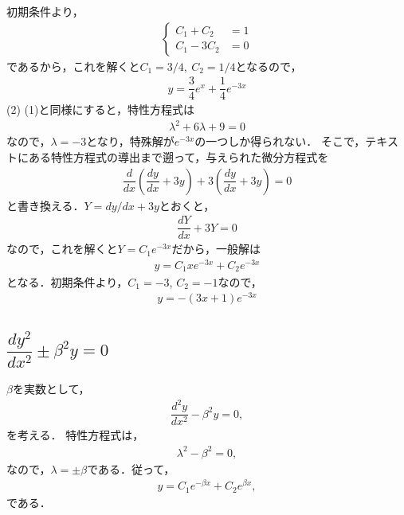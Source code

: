 初期条件より，
\begin{align}
  \begin{cases}
    C_1 + C_2   &= 1 \\
    C_1 - 3C_2  &= 0 
  \end{cases}
\end{align}
であるから，これを解くと$C_1=3/4,~C_2 = 1/4$となるので，
\begin{align}
 y = \dfrac{3}{4}e^{x} + \dfrac{1}{4}e^{-3x} 
\end{align}
%
(2) (1)と同様にすると，特性方程式は
\begin{align}
  \lambda^2 + 6\lambda + 9 = 0 
\end{align}
なので，$\lambda = -3$となり，特殊解が$e^{-3x}$の一つしか得られない．
そこで，テキストにある特性方程式の導出まで遡って，与えられた微分方程式を
\begin{align}
  \dfrac{d}{dx}\left(\dfrac{dy}{dx}+3y\right) + 3\left(\dfrac{dy}{dx}+3y\right) = 0 
\end{align}
と書き換える．$Y=dy/dx+3y$とおくと，
\begin{align}
  \dfrac{dY}{dx} + 3Y = 0 
\end{align}
なので，これを解くと$Y=C_1 e^{-3x}$だから，一般解は
\begin{align}
 y = C_1 x e^{-3x} + C_2 e^{-3x}
\end{align}
となる．初期条件より，$C_1=-3$, $C_2=-1$なので，
\begin{align}
  y = -\left(3x+1\right)e^{-3x} 
\end{align}
%
\newpage
%
%
\subsection{$\dfrac{dy^2}{dx^2} \pm \beta^2 y =0$}
$\beta$を実数として，
\begin{align}
  \dfrac{d^2 y}{dx^2} - \beta^{2}y = 0, \label{eq:PDE_05_01}
\end{align}
を考える．
特性方程式は，
\begin{align}
  \lambda^2 -\beta^2 = 0,
\end{align}
なので，$\lambda = \pm \beta$である．従って，
\begin{align}
  y = C_{1} e^{-\beta x} + C_{2} e^{\beta x},
\end{align}
である．

